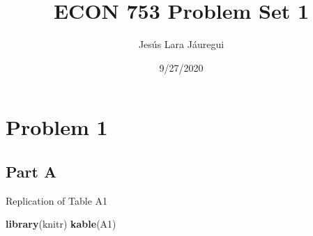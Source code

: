 \documentclass[
]{article}
\title{ECON 753 Problem Set 1}
\author{Jesús Lara Jáuregui}
\date{9/27/2020}
\newenvironment{Shaded}{\begin{snugshade}}{\end{snugshade}}
\newcommand{\KeywordTok}[1]{\textcolor[rgb]{0.13,0.29,0.53}{\textbf{#1}}}
\newcommand{\NormalTok}[1]{#1}
\begin{document}
\maketitle

\hypertarget{problem-1}{%
\section{Problem 1}\label{problem-1}}

\hypertarget{part-a}{%
\subsection{Part A}\label{part-a}}

Replication of Table A1

\begin{Shaded}
\begin{Highlighting}[]
\KeywordTok{library}\NormalTok{(knitr)}
\KeywordTok{kable}\NormalTok{(A1)}
\end{Highlighting}
\end{Shaded}
\end{document}
